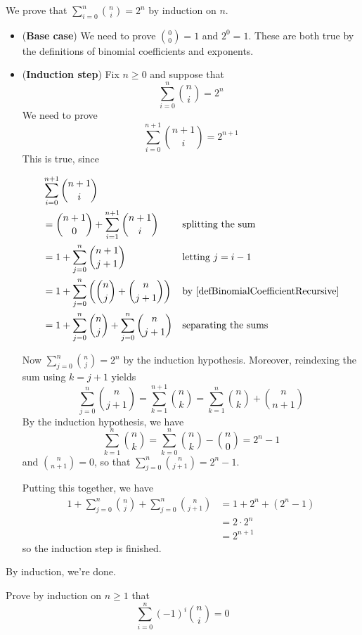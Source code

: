 \begin{example}
\label{exSumOfBinomialCoefficients}
We prove that $\sum_{i=0}^n \binom{n}{i} = 2^n$ by induction on $n$.
\begin{itemize}
\item (\textbf{Base case}) We need to prove $\binom{0}{0} = 1$ and $2^0=1$. These are both true by the definitions of binomial coefficients and exponents.
\item (\textbf{Induction step}) Fix $n \ge 0$ and suppose that
\[ \sum_{i=0}^n \binom{n}{i} = 2^n \]
We need to prove
\[ \sum_{i=0}^{n+1} \binom{n+1}{i} = 2^{n+1} \]
This is true, since

\begin{align*}
&\sum_{i=0}^{n+1} \binom{n+1}{i} && \\
&= \binom{n+1}{0} + \sum_{i=1}^{n+1} \binom{n+1}{i} && \text{splitting the sum} \\
&= 1 + \sum_{j=0}^n \binom{n+1}{j+1} && \text{letting $j=i-1$} \\
&= 1 + \sum_{j=0}^n \left(\binom{n}{j} + \binom{n}{j+1}\right) && \text{by \Cref{defBinomialCoefficientRecursive}} \\
&= 1 + \sum_{j=0}^n \binom{n}{j} + \sum_{j=0}^n \binom{n}{j+1} && \text{separating the sums}
\end{align*}

Now $\sum_{j=0}^n \binom{n}{j} = 2^n$ by the induction hypothesis. Moreover, reindexing the sum using $k=j+1$ yields
\[ \sum_{j=0}^n \binom{n}{j+1} = \sum_{k=1}^{n+1} \binom{n}{k} = \sum_{k=1}^n \binom{n}{k} + \binom{n}{n+1} \]
By the induction hypothesis, we have
\[ \sum_{k=1}^n \binom{n}{k} = \sum_{k=0}^n \binom{n}{k} - \binom{n}{0} = 2^n-1 \]
and $\binom{n}{n+1} = 0$, so that $\sum_{j=0}^n \binom{n}{j+1} = 2^n-1$.

Putting this together, we have
\begin{align*}
1 + \sum_{j=0}^n \binom{n}{j} + \sum_{j=0}^n \binom{n}{j+1}
&= 1 + 2^n + (2^n-1) \\
&= 2 \cdot 2^n \\
&= 2^{n+1}
\end{align*}
so the induction step is finished.
\end{itemize}
By induction, we're done.
\end{example}

\begin{exercise}
\label{exAlternatingSumOfBinomialCoefficientsIsZero}
Prove by induction on $n \ge 1$ that
\[ \sum_{i=0}^n (-1)^i \binom{n}{i} = 0 \]
\end{exercise}

